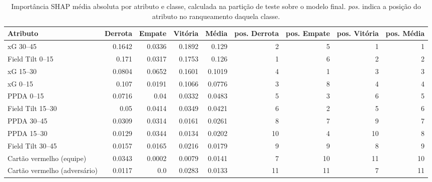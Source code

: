 \begin{table}[htbp]
\centering
\caption{Importância SHAP média absoluta por atributo e classe, calculada na partição de teste sobre o modelo final. \emph{pos.} indica a posição do atributo no ranqueamento daquela classe.}
\label{tab:wp4-shap-classe}
\small
\begin{tabular}{lrrrrrrrr}
\toprule
Atributo & Derrota & Empate & Vitória & Média & pos. Derrota & pos. Empate & pos. Vitória & pos. Média \\
\midrule
xG 30–45 & 0.1642 & 0.0336 & 0.1892 & 0.129 & 2 & 5 & 1 & 1 \\
Field Tilt 0–15 & 0.171 & 0.0317 & 0.1753 & 0.126 & 1 & 6 & 2 & 2 \\
xG 15–30 & 0.0804 & 0.0652 & 0.1601 & 0.1019 & 4 & 1 & 3 & 3 \\
xG 0–15 & 0.107 & 0.0191 & 0.1066 & 0.0776 & 3 & 8 & 4 & 4 \\
PPDA 0–15 & 0.0716 & 0.04 & 0.0332 & 0.0483 & 5 & 3 & 6 & 5 \\
Field Tilt 15–30 & 0.05 & 0.0414 & 0.0349 & 0.0421 & 6 & 2 & 5 & 6 \\
PPDA 30–45 & 0.0309 & 0.0314 & 0.0161 & 0.0261 & 8 & 7 & 9 & 7 \\
PPDA 15–30 & 0.0129 & 0.0344 & 0.0134 & 0.0202 & 10 & 4 & 10 & 8 \\
Field Tilt 30–45 & 0.0157 & 0.0165 & 0.0216 & 0.0179 & 9 & 9 & 8 & 9 \\
Cartão vermelho (equipe) & 0.0343 & 0.0002 & 0.0079 & 0.0141 & 7 & 10 & 11 & 10 \\
Cartão vermelho (adversário) & 0.0117 & 0.0 & 0.0283 & 0.0133 & 11 & 11 & 7 & 11 \\
\bottomrule
\end{tabular}
\end{table}
